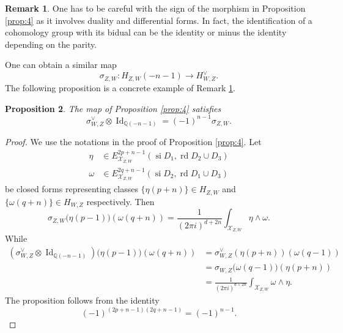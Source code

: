 \documentclass[11pt,a4paper]{amsart}
\newcommand{\Q}{\mathds{Q}}
\newcommand{\caX}{\mathcal{X}}
\DeclareMathOperator{\si}{si}
\DeclareMathOperator{\rd}{rd}
\DeclareMathOperator{\Id}{Id}
\numberwithin{equation}{section}
\theoremstyle{plain}
\newtheorem{prop}{Proposition}[section]
\theoremstyle{definition}
\newtheorem{rmk}[prop]{Remark}
\begin{document}
  \begin{rmk}\label{rem:10}
    One has to be careful with the sign of the morphism in
    Proposition \ref{prop:4} as it involves duality and differential
    forms. In fact, the identification of a cohomology group
    with its bidual can be the identity or minus the identity
    depending on the parity. 
  \end{rmk}
  One can obtain a similar map
  \begin{displaymath}
   \sigma_{Z,W}\colon H_{Z,W}(-n-1)\longrightarrow H_{W,Z}^{\vee}.
  \end{displaymath}
  The following proposition is a concrete example of Remark \ref{rem:10}.
  \begin{prop}\label{prop:12}
  The map of Proposition \ref{prop:4} satisfies  
  \begin{displaymath}
    \sigma^{\vee}_{W,Z}\otimes \Id_{\Q(-n-1)}=(-1)^{n-1}\sigma_{Z,W}.
  \end{displaymath}
  \end{prop}
  \begin{proof}
    We use the notations in the proof of Proposition \ref{prop:4}.
    Let
    \begin{align*}
      \eta &\in E^{2p+n-1}_{\caX_{Z,W}}(\si D_{1}, \rd D_{2}\cup
              D_{3})\\
      \omega &\in E^{2q+n-1}_{\caX_{Z,W}}(\si D_{2}, \rd
  D_{1}\cup D_{3})
    \end{align*}
    be closed forms representing classes $\{\eta(p+n) \}\in H_{Z,W}$
    and $\{\omega (q+n)\}\in H_{W,Z}$ respectively. Then
    \begin{displaymath}
      \sigma _{Z,W}\big(\eta(p-1)\big)(\omega (q+n)
      )=\frac{1}{(2\pi i)^{d+2n}}\int_{\caX_{Z,W}}\eta \wedge \omega.
    \end{displaymath}
    While
    \begin{align*}
      (\sigma^{\vee} _{W,Z}\otimes \Id_{\Q(-n-1)})\big(\eta(p-1)\big)(\omega (q+n)
      )  &=
      \sigma^{\vee} _{W,Z}(\eta(p+n) )(\omega(q-1))\\
      &=
      \sigma _{W,Z}\big(\omega (q-1)\big)(\eta(p+n) )\\
        &=\frac{1}{(2\pi i)^{d+2n}}
      \int_{\caX_{Z,W}}\omega \wedge \eta. 
    \end{align*}
 The proposition follows from the identity
 \begin{displaymath}
   (-1)^{(2p+n-1)(2q+n-1)}=(-1)^{n-1}.
 \end{displaymath}
\end{proof}
\end{document}
